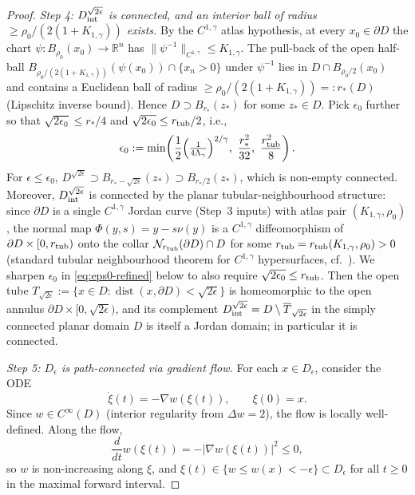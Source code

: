 \documentclass[11pt]{amsart}
\newcommand{\R}{\mathbb R}
\DeclareMathOperator{\dist}{dist}
\begin{document}
\begin{proof}
\emph{Step 4: $D^{\sqrt{2\epsilon}}_{\rm int}$ is connected, and an
interior ball of radius $\ge \rho_0/(2(1+K_{1,\gamma}))$ exists.}
By the $C^{1,\gamma}$ atlas hypothesis, at every $x_0\in\partial D$
the chart $\psi:B_{\rho_0}(x_0)\to\R^n$ has
$\|\psi^{-1}\|_{C^{1,\gamma}}\le K_{1,\gamma}$.  The pull-back of
the open half-ball
$B_{\rho_0/(2(1+K_{1,\gamma}))}(\psi(x_0))\cap\{x_n>0\}$ under
$\psi^{-1}$ lies in $D\cap B_{\rho_0/2}(x_0)$ and contains a
Euclidean ball of radius $\ge\rho_0/(2(1+K_{1,\gamma}))=:r_*(D)$
\textup{(}Lipschitz inverse bound\textup{)}.  Hence
$D\supset B_{r_*}(z_*)$ for some $z_*\in D$.  Pick
\(\epsilon_0\) further so that $\sqrt{2\epsilon_0}\le r_*/4$ and
$\sqrt{2\epsilon_0}\le r_{\rm tub}/2$, i.e.,
\begin{equation}\label{eq:eps0-refined}
   \epsilon_0:=\min\!\left(
     \frac{1}{2}\Bigl(\tfrac{1}{4\Lambda_\gamma}\Bigr)^{2/\gamma},\
     \frac{r_*^{2}}{32},\
     \frac{r_{\rm tub}^{2}}{8}\right).
\end{equation}
For $\epsilon\le\epsilon_0$, $D^{\sqrt{2\epsilon}}\supset
B_{r_*-\sqrt{2\epsilon}}(z_*)\supset B_{r_*/2}(z_*)$, which is
non-empty connected.  Moreover, $D^{\sqrt{2\epsilon}}_{\rm int}$ is
connected by the planar tubular-neighbourhood structure: since
$\partial D$ is a single $C^{1,\gamma}$ Jordan curve (Step~3 inputs)
with atlas pair $(K_{1,\gamma},\rho_0)$, the normal map
$\Phi(y,s)=y-s\nu(y)$ is a $C^{1,\gamma}$ diffeomorphism of
$\partial D\times[0,r_{\rm tub})$ onto the collar
$\mathcal N_{r_{\rm tub}}(\partial D)\cap D$ for some
$r_{\rm tub}=r_{\rm tub}(K_{1,\gamma},\rho_0)>0$
\textup{(}standard tubular neighbourhood theorem for $C^{1,\gamma}$
hypersurfaces, cf.\ \cite[Theorem~3.1]{HP}\textup{)}.  We sharpen
$\epsilon_0$ in \eqref{eq:eps0-refined} below to also require
$\sqrt{2\epsilon_0}\le r_{\rm tub}$.  Then the open tube
$T_{\sqrt{2\epsilon}}:=\{x\in D:\dist(x,\partial D)<\sqrt{2\epsilon}\}$
is homeomorphic to the open annulus
$\partial D\times[0,\sqrt{2\epsilon})$, and its complement
$D^{\sqrt{2\epsilon}}_{\rm int}=D\setminus\overline T_{\sqrt{2\epsilon}}$
in the simply connected planar domain $D$ is itself a Jordan domain;
in particular it is connected.

\emph{Step 5: $D_\epsilon$ is path-connected via gradient flow.}
For each $x\in D_\epsilon$, consider the ODE
\begin{equation}\label{eq:grad-flow}
   \dot\xi(t)=-\nabla w(\xi(t)),\qquad \xi(0)=x.
\end{equation}
Since $w\in C^\infty(D)$ (interior regularity from $\Delta w=2$),
the flow is locally well-defined.  Along the flow,
\begin{equation}\label{eq:w-monotone}
   \frac{d}{dt}w(\xi(t))=-|\nabla w(\xi(t))|^{2}\le 0,
\end{equation}
so $w$ is non-increasing along $\xi$, and $\xi(t)\in\{w\le w(x)<
-\epsilon\}\subset D_\epsilon$ for all $t\ge 0$ in the maximal
forward interval.


\end{proof}
\end{document}
